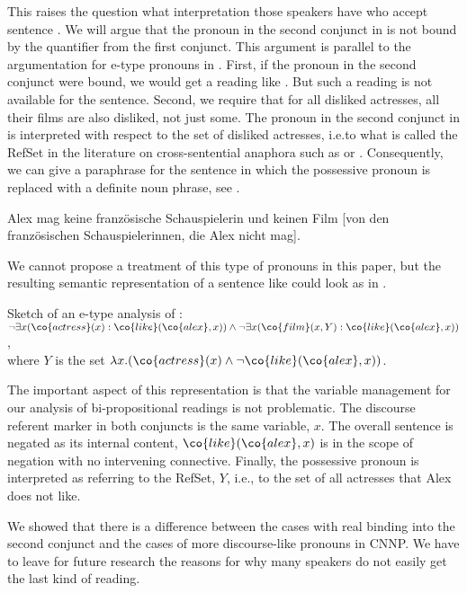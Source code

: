 \documentclass[output=paper]{langsci/langscibook}
\begin{document}
This raises the question what interpretation those speakers have who accept sentence . 
We will argue that the pronoun in the second conjunct in  is not bound by the quantifier from the first conjunct. 
This argument is parallel to the argumentation for e-type pronouns in \citet{Evans:77,Evans:80}.
First, if the pronoun in the second conjunct were bound, we would get a reading like . But such a reading is not available for the sentence.
Second, we require that for all disliked actresses, all their films are also disliked, not just some.
The pronoun in the second conjunct in  is interpreted with respect to the set of disliked actresses, i.e.\@ to what is called the RefSet in the literature on cross-sentential anaphora such as \citet{Nouwen:03} or \citet{Luecking:Ginzburg:19}.
Consequently, we can give a paraphrase for the sentence in which the possessive pronoun is replaced with a definite noun phrase, see .

\ea \label{para-ana-sogutwie}
Alex mag keine französische Schauspielerin und 
keinen Film [von den französischen Schauspielerinnen, die Alex nicht mag].
\glt {}
\z 

We cannot propose a treatment of this type of pronouns in this paper, but the resulting semantic representation of a sentence like  could look as in .

\ea \label{lf-etype}
Sketch of an e-type analysis of :\\
$\lnot \exists x (\co{actress}(x) : \co{like}(\co{alex},x)) \land
\lnot \exists x (\co{film}(x,Y) : \co{like}(\co{alex},x))$, 
\\where $Y$ is the set
$\lambda x. (\co{actress}(x) \land \lnot \co{like}(\co{alex},x))$.
\z\largerpage[-1]

The important aspect of this representation is that the variable management for our analysis of bi-propositional readings is not problematic. The discourse referent marker in both conjuncts is the same variable, $x$. 
The overall sentence is negated as its internal content, $\co{like}(\co{alex},x)$ is in the scope of negation with no intervening connective. 
Finally, the possessive pronoun is interpreted as referring to the RefSet, $Y$, i.e., to the set of all actresses that Alex does not like.

We showed that there is a difference between the cases with real binding into the second conjunct and the cases of more discourse-like pronouns in CNNP. 
We have to leave for future research the reasons for why many speakers do not easily get the last kind of reading.
\end{document}
